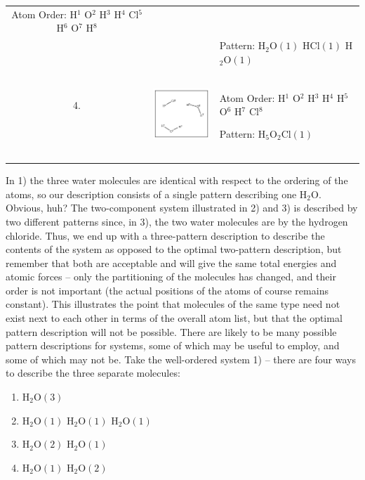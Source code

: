 \begin{table}
\begin{tabular}{c c l}
		Atom Order: H$^1$ O$^2$ H$^3$ H$^4$ Cl$^5$ H$^6$ O$^7$ H$^8$ \\
		& & Pattern: H$_2$O$(1)$ HCl$(1)$ H$_2$O$(1)$ \\\\\\\\\\\\
	4. & \multirow{2}{*}{ \includegraphics[width=3cm]{images/pattern4} } &
		Atom Order: H$^1$ O$^2$ H$^3$ H$^4$ H$^5$ O$^6$ H$^7$ Cl$^8$ \\
		& & Pattern: H$_5$O$_2$Cl$(1)$ \\\\\\\\\\\\
\end{tabular}
\end{table}


In 1) the three water molecules are identical with respect to the ordering of the atoms, so our description consists of a single pattern describing one H$_2$O. Obvious, huh? The two-component system illustrated in 2) and 3) is described by two different patterns since, in 3), the two water molecules are  by the hydrogen chloride. Thus, we end up with a three-pattern description to describe the contents of the system as opposed to the optimal two-pattern description, but remember that both are acceptable and will give the same total energies and atomic forces -- only the partitioning of the molecules has changed, and their order is not important (the actual positions of the atoms of course remains constant). This illustrates the point that molecules of the same type need not exist next to each other in terms of the overall atom list, but that the optimal pattern description will not be possible. There are likely to be many possible pattern descriptions for systems, some of which may be useful to employ, and some of which may not be. Take the well-ordered system 1) -- there are four ways to describe the three separate molecules:

\begin{enumerate}
	\item H$_2$O$(3)$
	\item H$_2$O$(1)$ H$_2$O$(1)$ H$_2$O$(1)$
	\item H$_2$O$(2)$ H$_2$O$(1)$
	\item H$_2$O$(1)$ H$_2$O$(2)$
\end{enumerate}

